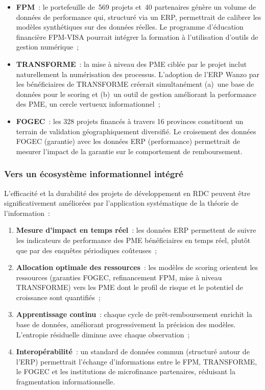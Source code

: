 \documentclass[12pt, a4paper, twocolumn]{article}
\begin{document}
\begin{itemize}[leftmargin=*]
  \item \textbf{FPM}~: le portefeuille de~569 projets et~40 partenaires génère un volume de données de performance qui, structuré via un ERP, permettrait de calibrer les modèles synthétiques sur des données réelles. Le programme d'éducation financière FPM-VISA pourrait intégrer la formation à l'utilisation d'outils de gestion numérique~;
  \item \textbf{TRANSFORME}~: la mise à niveau des PME ciblée par le projet inclut naturellement la numérisation des processus. L'adoption de l'ERP Wanzo par les bénéficiaires de TRANSFORME créerait simultanément (a)~une base de données pour le scoring et (b)~un outil de gestion améliorant la performance des PME, un cercle vertueux informationnel~;
  \item \textbf{FOGEC}~: les 328 projets financés à travers 16 provinces constituent un terrain de validation géographiquement diversifié. Le croisement des données FOGEC (garantie) avec les données ERP (performance) permettrait de mesurer l'impact de la garantie sur le comportement de remboursement.
\end{itemize}

\subsubsection{Vers un écosystème informationnel intégré}
\label{subsubsec:ecosysteme}

L'efficacité et la durabilité des projets de développement en RDC peuvent être significativement améliorées par l'application systématique de la théorie de l'information~:

\begin{enumerate}[leftmargin=*]
  \item \textbf{Mesure d'impact en temps réel}~: les données ERP permettent de suivre les indicateurs de performance des PME bénéficiaires en temps réel, plutôt que par des enquêtes périodiques coûteuses~;
  \item \textbf{Allocation optimale des ressources}~: les modèles de scoring orientent les ressources (garanties FOGEC, refinancement FPM, mise à niveau TRANSFORME) vers les PME dont le profil de risque et le potentiel de croissance sont quantifiés~;
  \item \textbf{Apprentissage continu}~: chaque cycle de prêt-remboursement enrichit la base de données, améliorant progressivement la précision des modèles. L'entropie résiduelle diminue avec chaque observation~;
  \item \textbf{Interopérabilité}~: un standard de données commun (structuré autour de l'ERP) permettrait l'échange d'informations entre le FPM, TRANSFORME, le FOGEC et les institutions de microfinance partenaires, réduisant la fragmentation informationnelle.
\end{enumerate}
\end{document}
